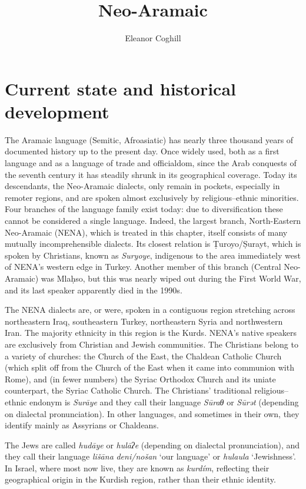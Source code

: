\documentclass[output=paper]{langsci/langscibook}
\author{Eleanor Coghill\affiliation{Uppsala University}}
\title{Neo-Aramaic}
\begin{document}
\section{Current state and historical development}

The Aramaic language (Semitic, Afroasiatic) has nearly three thousand years of documented history up to the present day. Once widely used, both as a first language and as a language of trade and officialdom, since the Arab conquests of the seventh century it has steadily shrunk in its geographical coverage. Today its descendants, the Neo-Aramaic dialects, only remain in pockets, especially in remoter regions, and are spoken almost exclusively by religious–ethnic minorities. Four branches of the language family exist today: due to diversification these cannot be considered a single language. Indeed, the largest branch, North-Eastern Neo-Aramaic (NENA), which is treated in this chapter, itself consists of many mutually incomprehensible dialects. Its closest relation is Ṭuroyo/Ṣurayt, which is spoken by Christians, known as \textit{Suryoye}, indigenous to the area immediately west of NENA’s western edge in Turkey. Another member of this branch (Central Neo-Aramaic) was Mlaḥso, but this was nearly wiped out during the First World War, and its last speaker apparently died in the 1990s. 

The NENA dialects are, or were, spoken in a contiguous region stretching across northeastern Iraq, southeastern Turkey, northeastern Syria and northwestern Iran. The majority ethnicity in this region is the Kurds. NENA’s native speakers are exclusively from Christian and Jewish communities. The Christians belong to a variety of churches: the Church of the East, the Chaldean Catholic Church (which split off from the Church of the East when it came into communion with Rome), and (in fewer numbers) the Syriac Orthodox Church and its uniate counterpart, the Syriac Catholic Church. The Christians’ traditional religious–ethnic endonym is \textit{Surāye} and they call their language \textit{Sūraθ} or \textit{Sūrət} (depending on dialectal pronunciation). In other languages, and sometimes in their own, they identify mainly as Assyrians or Chaldeans.

The Jews are called \textit{hudāye} or \textit{hulāʔe} (depending on dialectal pronunciation), and they call their language \textit{lišāna} \textit{deni/nošan} ‘our language’ or \textit{hulaula} ‘Jewishness’. In Israel, where most now live, they are known as \textit{kurdím}, reflecting their geographical origin in the Kurdish region, rather than their ethnic identity.
\end{document}
